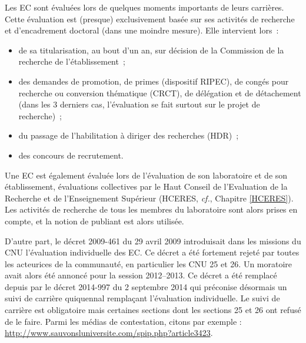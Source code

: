 Les EC sont \'evalu\'e\mp e\mp s lors de quelques moments importants de leurs carri\`eres.
Cette \'evaluation est (presque) exclusivement bas\'ee sur ses activit\'es de recherche
et d'encadrement doctoral (dans une moindre mesure).
Elle intervient lors~:
\begin{itemize}
\item de sa titularisation, au bout d'un an, sur d\'ecision de la Commission de la recherche de l'\'etablissement~;
\item des demandes de promotion, de primes (dispositif RIPEC),
de cong\'es pour recherche ou conversion
th\'ematique (CRCT), de d\'el\'egation et de d\'etachement (dans les
3 derniers cas, l'\'evaluation se fait surtout sur le projet de
recherche)~;
\item du passage de l'habilitation \`a diriger des recherches (HDR)~;
\item des concours de recrutement.
\end{itemize}
Un\mp e EC est \'egalement \'evalu\'e\mp e lors de l'\'evaluation de son laboratoire
et de son \'etablissement,
\'evaluations collectives par le Haut Conseil de l'Evaluation de la
Recherche et de l'Enseignement Sup\'erieur (HCERES, {\em cf.}, Chapitre \ref{HCERES}).
Les activit\'es de recherche de tous les membres du
laboratoire sont alors prises en compte, et la notion de \og publiant\fg{} est
alors utilis\'ee.
%

D'autre part, le d\'ecret 2009-461 du 29 avril 2009 introduisait dans les missions du CNU l'\'evaluation individuelle des EC. 
Ce d\'ecret a \'et\'e fortement rejet\'e par tou\mp te\mp s les acteur\mp ice\mp s de la communaut\'e, en particulier les CNU 25 et 26.
Un moratoire avait alors \'et\'e annonc\'e pour la session 2012--2013. 
Ce d\'ecret a \'et\'e remplac\'e depuis par le d\'ecret 2014-997 du 2 septembre 2014 qui pr\'econise
d\'esormais un \og suivi de carri\`ere\fg{} quiquennal rempla\c{c}ant l'\'evaluation individuelle. Le suivi de carri\`ere est obligatoire mais certaines sections dont les sections 25 et 26 ont refus\'e de le faire. Parmi les m\'edias de contestation, citons par exemple : \url{http://www.sauvonsluniversite.com/spip.php?article3423}.

